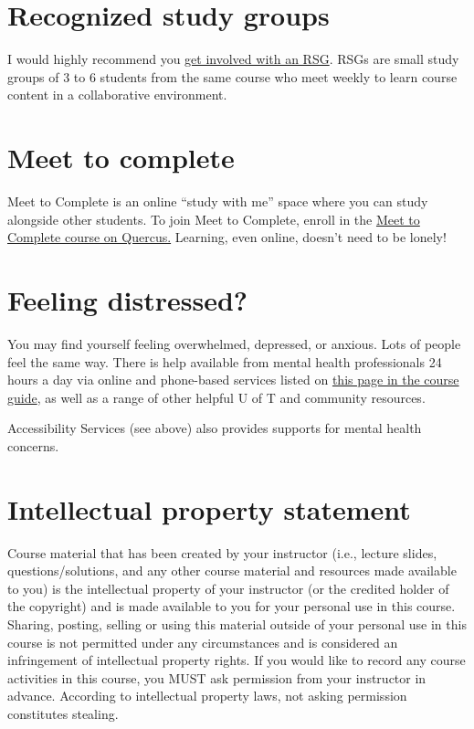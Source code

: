 \documentclass[
  openany]{book}
\begin{document}
\hypertarget{recognized-study-groups}{%
\section{Recognized study groups}\label{recognized-study-groups}}

I would highly recommend you \href{https://sidneysmithcommons.artsci.utoronto.ca/recognized-study-groups/join/}{get involved with an RSG}. RSGs are small study groups of 3 to 6 students from the same course who meet weekly to learn course content in a collaborative environment.

\hypertarget{meet-to-complete}{%
\section{Meet to complete}\label{meet-to-complete}}

Meet to Complete is an online ``study with me'' space where you can study alongside other students. To join Meet to Complete, enroll in the \href{https://q.utoronto.ca/enroll/8CXECE}{Meet to Complete course on Quercus.} Learning, even online, doesn't need to be lonely!

\hypertarget{feeling-distressed}{%
\section{Feeling distressed?}\label{feeling-distressed}}

You may find yourself feeling overwhelmed, depressed, or anxious. Lots of people feel the same way. There is help available from mental health professionals 24 hours a day via online and phone-based services listed on \href{https://sta303-bolton.github.io/sta303-w22-courseguide/resources.html\#student-support-services-and-resources}{this page in the course guide}, as well as a range of other helpful U of T and community resources.

Accessibility Services (see above) also provides supports for mental health concerns.

\hypertarget{intellectual-property-statement}{%
\section{Intellectual property statement}\label{intellectual-property-statement}}

Course material that has been created by your instructor (i.e., lecture slides, questions/solutions, and any other course material and resources made available to you) is the intellectual property of your instructor (or the credited holder of the copyright) and is made available to you for your personal use in this course. Sharing, posting, selling or using this material outside of your personal use in this course is not permitted under any circumstances and is considered an infringement of intellectual property rights. If you would like to record any course activities in this course, you MUST ask permission from your instructor in advance. According to intellectual property laws, not asking permission constitutes stealing.
\end{document}
